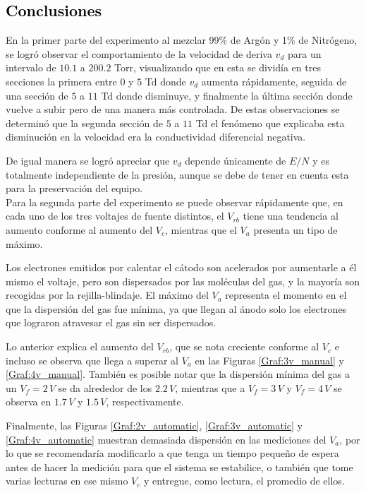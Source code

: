 \textcolor{black}{\section{Conclusiones}}

\noindent En la primer parte del experimento al mezclar 99\% de Argón y 1\% de Nitrógeno, se logró observar el comportamiento de la velocidad de deriva $v_d$ para un intervalo de $10.1$ a $200.2$ Torr, visualizando que en esta se dividía en tres secciones la primera entre $0$ y $5$ Td donde $v_d$ aumenta rápidamente, seguida de una sección de $5$ a $11$ Td donde disminuye, y finalmente la última sección donde vuelve a subir pero de una manera más controlada. De estas observaciones se determinó que la segunda sección de $5$ a $11$ Td el fenómeno que explicaba esta disminución en la velocidad era la conductividad diferencial negativa.

De igual manera se logró apreciar que $v_d$ depende únicamente de $E/N$ y es totalmente independiente de la presión, aunque se debe de tener en cuenta esta para la preservación del equipo. 
\\

Para la segunda parte del experimento se puede observar rápidamente que, en cada uno de los tres voltajes de fuente distintos, el $V_{rb}$ tiene una tendencia al aumento conforme al aumento del $V_c$, mientras que el $V_a$ presenta un tipo de máximo.

Los electrones emitidos por calentar el cátodo son acelerados por aumentarle a él mismo el voltaje, pero son dispersados por las moléculas del gas, y la mayoría son recogidas por la rejilla-blindaje. El máximo del $V_a$ representa el momento en el que la dispersión del gas fue mínima, ya que llegan al ánodo solo los electrones que lograron atravesar el gas sin ser dispersados.

Lo anterior explica el aumento del $V_{rb}$, que se nota creciente conforme al $V_c$ e incluso se observa que llega a superar al $V_a$ en las Figuras \ref{Graf:3v_manual} y \ref{Graf:4v_manual}. También es posible notar que la dispersión mínima del gas a un $V_f = 2\,V$ se da alrededor de los $2.2\,V$, mientras que a $V_f = 3\,V$ y $V_f = 4\,V$ se observa en $1.7\,V$ y $1.5\,V$, respectivamente.

Finalmente, las Figuras \ref{Graf:2v_automatic}, \ref{Graf:3v_automatic} y \ref{Graf:4v_automatic} muestran demasiada dispersión en las mediciones del $V_a$, por lo que se recomendaría modificarlo a que tenga un tiempo pequeño de espera antes de hacer la medición para que el sistema se estabilice, o también que tome varias lecturas en ese mismo $V_c$ y entregue, como lectura, el promedio de ellos.